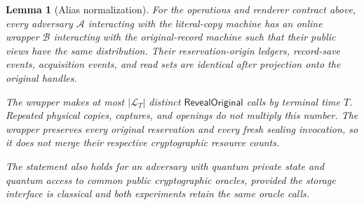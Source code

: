 \documentclass[pdflatex]{sn-jnl}
\theoremstyle{thmstyleone}
\newtheorem{lemma}[theorem]{Lemma}
\theoremstyle{thmstylethree}
\theoremstyle{thmstyletwo}
\begin{document}
\begin{lemma}[Alias normalization]
\label{lem:alias-normalization}
For the operations and renderer contract above, every adversary
$\mathcal A$ interacting with the literal-copy machine has an online wrapper
$\mathcal B$ interacting with the original-record machine such that their
public views have the same distribution.  Their reservation-origin ledgers,
record-save events, acquisition events, and read sets are identical after
projection onto the original handles.

The wrapper makes at most $|\mathcal L_T|$ distinct
$\mathsf{RevealOriginal}$ calls by terminal time $T$.  Repeated physical
copies, captures, and openings do not multiply this number.  The wrapper
preserves every original reservation and every fresh sealing invocation, so
it does not merge their respective cryptographic resource counts.

The statement also holds for an adversary with quantum private state and
quantum access to common public cryptographic oracles, provided the storage
interface is classical and both experiments retain the same oracle calls.
\end{lemma}
\end{document}
